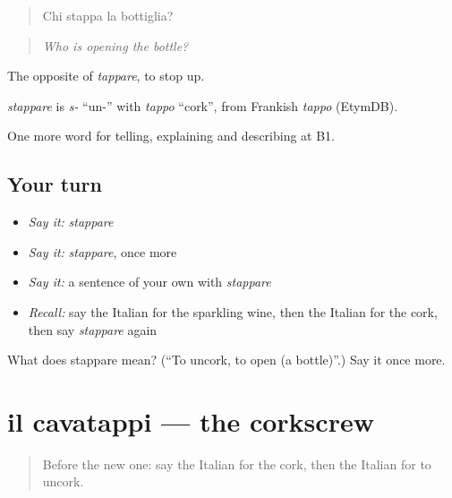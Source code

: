 \begin{quote}
Chi stappa la bottiglia?
\end{quote}

\begin{quote}
\emph{Who is opening the bottle?}
\end{quote}

The opposite of \emph{tappare}, to stop up.

\begin{cousinweb}
\emph{stappare} is \emph{s-} \textquotedblleft{}un-\textquotedblright{} with \emph{tappo} \textquotedblleft{}cork\textquotedblright{}, from Frankish \emph{tappo} (EtymDB).
\end{cousinweb}

\begin{grammarlens}[title={What you've built}]
One more word for telling, explaining and describing at B1.
\end{grammarlens}

\subsection*{Your turn}
\begin{itemize}
\raggedright
  \item \emph{Say it:} \emph{stappare}
  \item \emph{Say it:} \emph{stappare}, once more
  \item \emph{Say it:} a sentence of your own with \emph{stappare}
  \item \emph{Recall:} say the Italian for the sparkling wine, then the Italian for the cork, then say \emph{stappare} again
\end{itemize}

\begin{tcolorbox}[breakable,colback=teal!4,colframe=teal!35!black,title={Before you move on}]
What does stappare mean? (\textquotedblleft{}To uncork, to open (a bottle)\textquotedblright{}.) Say it once more.
\end{tcolorbox}
\section[il cavatappi]{il cavatappi — the corkscrew}

\label{lesson:IT-C317-cavatappi}



\begin{quote}
Before the new one: say the Italian for the cork, then the Italian for to uncork.
\end{quote}

